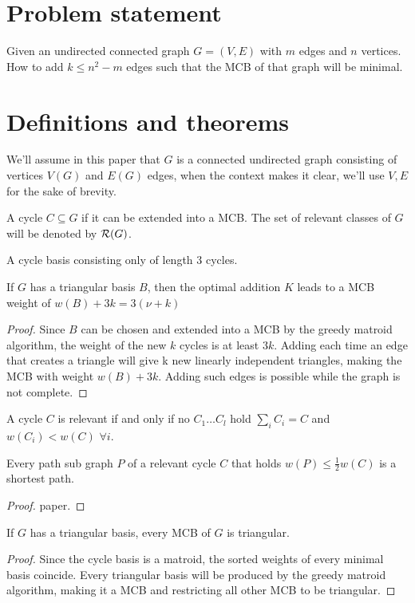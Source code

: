 \section{Problem statement}
Given an undirected connected graph
$G=(V,E)$ with $m$ edges and $n$ vertices. How to add $k\leq n^2 - m$ edges such that the MCB of that graph will be minimal.

\section{Definitions and theorems}
We'll assume in this paper that $G$ is a connected undirected graph consisting of vertices $V(G)$ and $E(G)$ edges, when the context makes it clear, we'll use $V,E$ for the sake of brevity.

\begin{definition}
    A cycle $C\subseteq G$ if it can be extended into a MCB. The set of relevant classes of $G$ will be denoted by $\mathcal{R}(G)$.
\end{definition}

\begin{definition}
    A cycle basis consisting only of length 3 cycles.
\end{definition}
\begin{lemma}
    If $G$ has a triangular basis $B$, then the optimal addition $K$ leads to a MCB weight of $w(B)+3k=3(\nu+k)$
\end{lemma}
\begin{proof}
    Since $B$ can be chosen and extended into a MCB by the greedy matroid algorithm, the weight of the new $k$ cycles is at least $3k$. Adding each time an edge that creates a triangle will give k new linearly independent triangles, making the MCB with weight $w(B)+3k$. Adding such edges is possible while the graph is not complete.
\end{proof}

\begin{lemma}
    A cycle $C$ is relevant if and only if no $C_1\ldots C_l$ hold $\sum_iC_i=C$ and $w(C_i)<w(C)$ $\forall i$.
\end{lemma}
\begin{lemma}
    Every path sub graph $P$ of a relevant cycle $C$ that holds $w(P)\leq \frac{1}{2}w(C)$ is a shortest path.
\end{lemma}
\begin{proof}
    paper.
\end{proof}

\begin{lemma}
    If $G$ has a triangular basis, every MCB of $G$ is triangular.
\end{lemma}
\begin{proof}
    Since the cycle basis is a matroid, the sorted weights of every minimal basis coincide. Every triangular basis will be produced by the greedy matroid algorithm, making it a MCB and restricting all other MCB to be triangular.
\end{proof}

